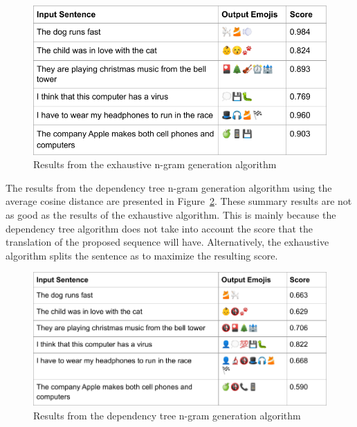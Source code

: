 \documentclass{article}[10]
\begin{document}
\begin{figure}[H]
  \begin{center}
    \includegraphics[width=\columnwidth]{figures/extractive.png}
    \caption{Results from the exhaustive n-gram generation
      algorithm\label{fig:extractive}}
  \end{center}
\end{figure}

The results from the dependency tree n-gram generation algorithm using the average cosine distance are presented
in Figure~\ref{fig:dependency}. These
summary results are not as good as the results of the exhaustive algorithm. This
is mainly because the dependency tree algorithm does not take into account the
score that the translation of the proposed sequence will have. Alternatively,
the exhaustive algorithm splits the sentence as to maximize the resulting score.

\begin{figure}[H]
  \begin{center}
    \includegraphics[width=\columnwidth]{figures/dependency.png}
    \caption{Results from the dependency tree n-gram generation
      algorithm\label{fig:dependency}}
  \end{center}
\end{figure}
\end{document}
